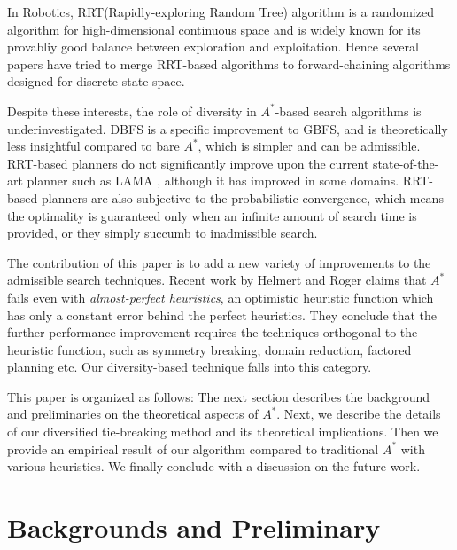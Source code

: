 In Robotics, RRT(Rapidly-exploring Random Tree) algorithm is a \sota randomized algorithm for high-dimensional continuous space and is widely known for its provabliy good balance between exploration and exploitation. Hence several papers \cite{alcazar2011adapting,burfoot2006rrt,likhachev2008r} have tried to merge RRT-based algorithms to forward-chaining algorithms designed for discrete state space.

Despite these interests, the role of diversity in \(A^*\)-based search
algorithms is underinvestigated.
DBFS is a specific improvement to GBFS, and is theoretically less insightful compared
to bare \(A^*\), which is simpler and can be admissible.
RRT-based planners do not significantly improve upon the current
state-of-the-art planner such as LAMA \cite{alcazar2011adapting}, although it
has improved in some domains. RRT-based planners are also subjective to
the probabilistic convergence, which means the optimality is guaranteed
only when an infinite amount of search time is provided, or they simply succumb to
inadmissible search.


The contribution of this paper is to add a new variety of improvements to the admissible search techniques.
Recent work by Helmert and Roger  claims that \(A^*\) fails even with \emph{almost-perfect heuristics}, an optimistic heuristic function which has only a constant error
behind the perfect heuristics.
They conclude that the further performance improvement requires the
techniques orthogonal to the heuristic function, such as symmetry breaking,
domain reduction, factored planning etc.
Our diversity-based technique falls into this category.

This paper is organized as follows: The next section describes the background and preliminaries on the theoretical aspects of \(A^*\). Next, we describe the details of our diversified tie-breaking method and its theoretical implications.  Then we provide an empirical result of our algorithm compared to traditional \(A^*\) with various heuristics. We finally conclude with a discussion on the future work.

\section{Backgrounds and Preliminary}
\label{sec-1}

